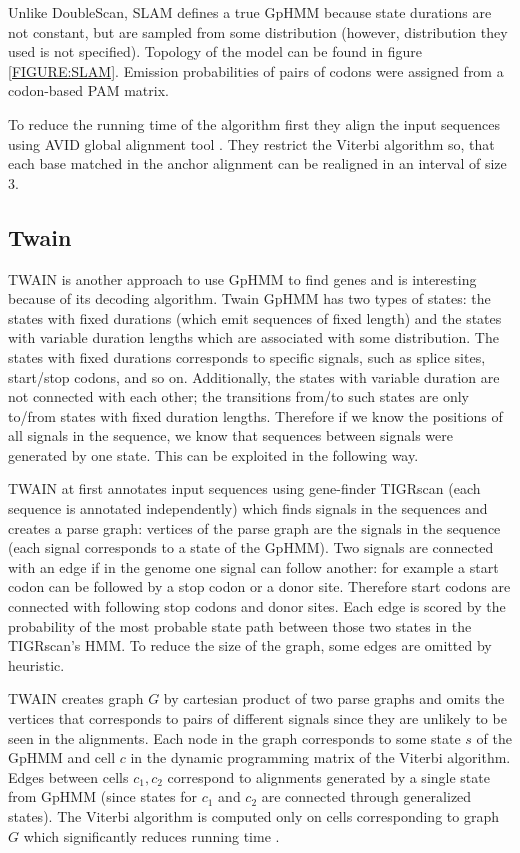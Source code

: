 Unlike DoubleScan, SLAM defines a true GpHMM because state durations are not
constant, but are sampled from some distribution (however, distribution they
used is not specified). Topology of the model can be found in figure
\ref{FIGURE:SLAM}.  Emission probabilities of pairs of codons were assigned from
a codon-based PAM matrix.


To reduce the running time of the algorithm first they  align the input
sequences using AVID global alignment tool \cite{Bray2003}. They restrict the
Viterbi algorithm so, that each base matched in the anchor alignment can be
realigned in an interval of size $3$.

\subsection{Twain}

TWAIN is another approach to use GpHMM to find genes \cite{Majoros2005} and is
interesting because of its decoding algorithm. Twain GpHMM has two types of
states: the states with fixed durations (which emit sequences of fixed length)
and the states with variable duration lengths which are associated with some
distribution.  The states with fixed durations corresponds to specific
signals, such as splice sites, start/stop codons, and so on.
Additionally, the states with variable duration are not connected with each
other; the transitions from/to such states are only to/from states with fixed
duration lengths. Therefore if we know the positions of all signals in the
sequence, we know that sequences between signals were generated by one state.
This can be exploited in the following way.

TWAIN at first annotates input sequences using gene-finder TIGRscan
\cite{Majoros2004} (each sequence is annotated independently) which finds
signals in the sequences and creates a parse graph: vertices of the parse graph are
the signals in the sequence (each signal corresponds to a state of the GpHMM).  Two
signals are connected with an edge if in the genome one signal can follow another:
for example a start codon can be followed by a stop codon or a donor site.
Therefore start codons are connected with following stop codons and
donor sites. Each edge is scored by the probability of the most probable state
path between those two states in the TIGRscan's HMM. To reduce the size of the
graph, some edges are omitted by heuristic.

TWAIN creates graph $G$ by cartesian product of two parse graphs and omits the
vertices that corresponds to pairs of different signals since they are unlikely
to be seen in the alignments. Each node in the graph corresponds to some state $s$
of the GpHMM and cell $c$ in the dynamic programming matrix of the Viterbi
algorithm.   Edges between cells $c_1,c_2$ correspond to alignments
generated by a single state from GpHMM (since states for $c_1$ and $c_2$ are
connected through generalized states).  The Viterbi algorithm is computed only
on cells corresponding to graph $G$ which significantly reduces running time
\cite{Majoros2005}.


